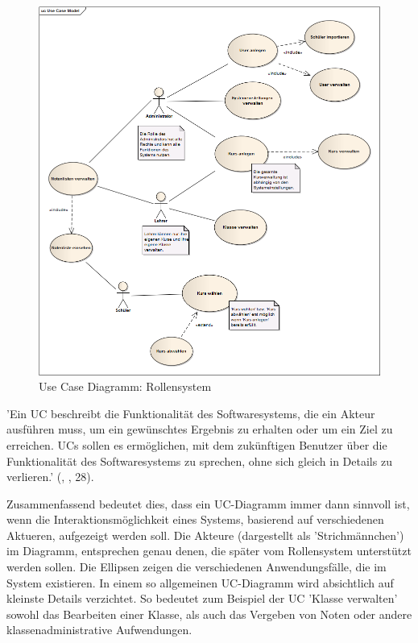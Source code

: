 \begin{figure}[H]
 \begin{center}
   \includegraphics[scale=0.5]{img/UseCaseModel_kuwasys20.png}
 \end{center}
 \caption[\textbf{Use Case Diagram: Rollensystem}]{Use Case Diagramm: Rollensystem}
 \label{fig:UML_UC_kuwasys20}
\end{figure}

'Ein \ac{UC} beschreibt die Funktionalität des Softwaresystems, die ein Akteur ausführen muss, um ein gewünschtes Ergebnis zu erhalten oder um ein Ziel zu erreichen. \ac{UC}s sollen es ermöglichen, mit dem zukünftigen Benutzer über die Funktionalität des Softwaresystems zu sprechen, ohne sich gleich in Details zu verlieren.' (, \cite{BalzertH-UML2}, 28).

Zusammenfassend bedeutet dies, dass ein \ac{UC-Diagramm} immer dann sinnvoll ist, wenn die Interaktionsmöglichkeit eines Systems, basierend auf verschiedenen Aktueren, aufgezeigt werden soll. Die Akteure (dargestellt als 'Strichmännchen') im Diagramm, entsprechen genau denen, die später vom Rollensystem unterstützt werden sollen. Die Ellipsen zeigen die verschiedenen Anwendungsfälle, die im System existieren. In einem so allgemeinen \ac{UC-Diagramm} wird absichtlich auf kleinste Details verzichtet. So bedeutet zum Beispiel der \ac{UC} 'Klasse verwalten' sowohl das Bearbeiten einer Klasse, als auch das Vergeben von Noten oder andere klassenadministrative Aufwendungen.

